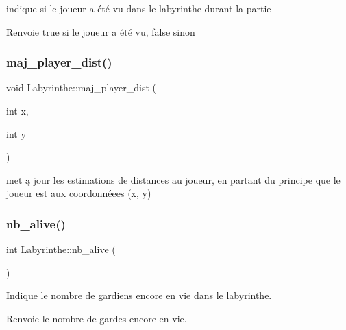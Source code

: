 indique si le joueur a été vu dans le labyrinthe durant la partie 

\begin{DoxyReturn}{Renvoie}
true si le joueur a été vu, false sinon 
\end{DoxyReturn}
\mbox{\label{classLabyrinthe_ac0aee40381eb415bccaa2f9ca2e3d0c4}} 
\subsubsection{\texorpdfstring{maj\+\_\+player\+\_\+dist()}{maj\_player\_dist()}}
{\footnotesize\ttfamily void Labyrinthe\+::maj\+\_\+player\+\_\+dist (\begin{DoxyParamCaption}\item[{int}]{x,  }\item[{int}]{y }\end{DoxyParamCaption})}



met ą jour les estimations de distances au joueur, en partant du principe que le joueur est aux coordonnéees (x, y) 

\mbox{\label{classLabyrinthe_ab13197de5f094c67422e558c2347dbe8}} 
\subsubsection{\texorpdfstring{nb\+\_\+alive()}{nb\_alive()}}
{\footnotesize\ttfamily int Labyrinthe\+::nb\+\_\+alive (\begin{DoxyParamCaption}{ }\end{DoxyParamCaption})\hspace{0.3cm}{\ttfamily [inline]}}



Indique le nombre de gardiens encore en vie dans le labyrinthe. 

\begin{DoxyReturn}{Renvoie}
le nombre de gardes encore en vie. 
\end{DoxyReturn}
\mbox{\label{classLabyrinthe_acc7682cd69ca12f27cb65457c9c8e89b}} 
